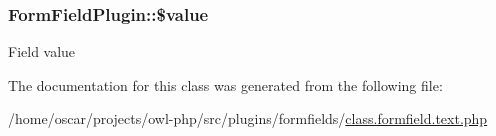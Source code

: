 \subsubsection[{\$value}]{\setlength{\rightskip}{0pt plus 5cm}FormFieldPlugin::\$value}\label{classFormFieldPlugin_abbe128149202f43e8fcac8184018048c}
Field value 

The documentation for this class was generated from the following file:\begin{DoxyCompactItemize}
\item 
/home/oscar/projects/owl-\/php/src/plugins/formfields/\hyperlink{class_8formfield_8text_8php}{class.formfield.text.php}\end{DoxyCompactItemize}
